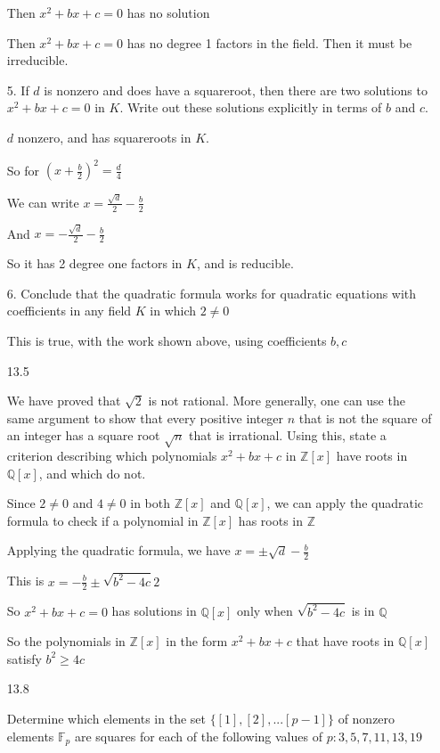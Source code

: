 \documentclass[12pt]{article}
\begin{document}
\begin{itemize}
		Then $x^2 + bx + c = 0$ has no solution

		Then $x^2 + bx + c = 0$ has no degree 1 factors in the field. Then it must be irreducible.

		5. If $d$ is nonzero and does have a squareroot, then there are two solutions to $x^2 + bx + c = 0$ in $K$. Write out these solutions explicitly in terms of $b$ and $c$.

		$d$ nonzero, and has squareroots in $K$. 
		
		So for $(x+\frac{b}{2})^2 = \frac{d}{4}$

		We can write $x =\frac{\sqrt{d}}{2} - \frac{b}{2}$

		And $x = -\frac{\sqrt{d}}{2} - \frac{b}{2}$

		So it has 2 degree one factors in $K$, and is reducible.

		6. Conclude that the quadratic formula works for quadratic equations with coefficients in any field $K$ in which $2\neq0$

		This is true, with the work shown above, using coefficients $b,c$

\newpage
\item[13.5]

	We have proved that $\sqrt{2}$ is not rational. More generally, one can use the same argument to show that every positive integer $n$ that is not the square of an integer has a square root $\sqrt{n}$ that is irrational. Using this, state a criterion describing which polynomials $x^2 + bx + c$ in $\mathbb{Z}[x]$ have roots in $\mathbb{Q}[x]$, and which do not.

	Since $2\neq0$ and $4\neq0$ in both $\mathbb{Z}[x]$ and $\mathbb{Q}[x]$, we can apply the quadratic formula to check if a polynomial in $\mathbb{Z}[x]$ has roots in $\mathbb{Z}$

	Applying the quadratic formula, we have $x = \pm\sqrt{d} - \frac{b}{2}$

	This is $x = -\frac{b}{2} \pm \sqrt{b^2 - 4c}{2}$

	So $x^2 + bx + c = 0$ has solutions in $\mathbb{Q}[x]$ only when $\sqrt{b^2 - 4c}$ is in $\mathbb{Q}$

	So the polynomials in $\mathbb{Z}[x]$ in the form $x^2 + bx + c$ that have roots in $\mathbb{Q}[x]$ satisfy $b^2 \geq 4c$

\newpage
\item[13.8]

	Determine which elements in the set $\{[1],[2],...[p-1]\}$ of nonzero elements $\mathbb{F}_p$ are squares for each of the following values of $p: 3,5,7,11,13,19$


\end{itemize}
\end{document}
